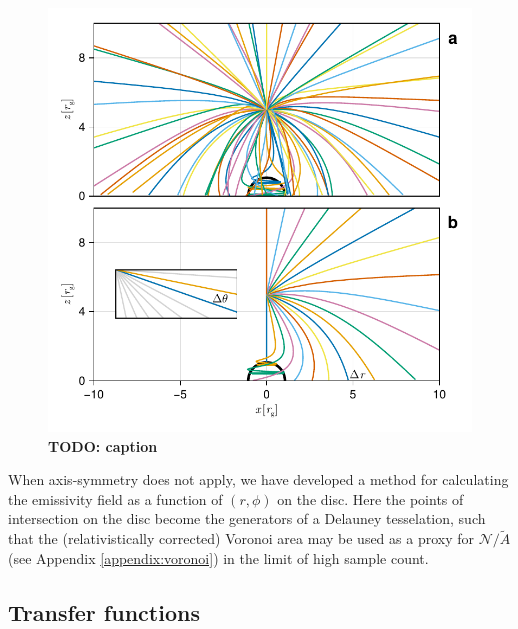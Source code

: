 \documentclass[fleqn,usenatbib]{mnras}
\newcommand{\todo}[1]{{\noindent \bf \color{red} TODO: #1}}
\begin{document}
\begin{figure}
    \centering
    \includegraphics[width=0.95\linewidth]{figures/emissivity.coronal-traces.pdf}
    \caption{\todo{caption}}
    \label{fig:coronal-tracing}
\end{figure}

When axis-symmetry does not apply, we have developed a method for calculating the emissivity field as a function of $(r, \phi)$ on the disc. Here the points of intersection on the disc become the generators of a Delauney tesselation, such that the (relativistically corrected) Voronoi area may be used as a proxy for $\mathcal{N} /\tilde{A}$ (see Appendix \ref{appendix:voronoi}) in the limit of high sample count.

\subsection{Transfer functions}
\label{sec:transfer-functions}
\end{document}
